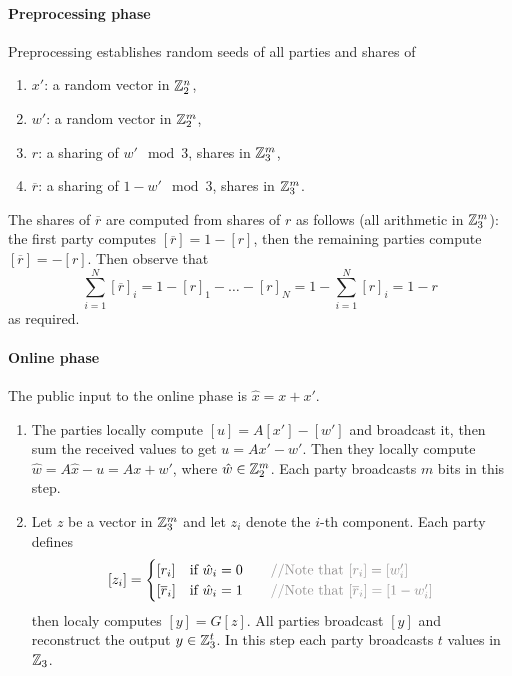 \paragraph{Preprocessing phase} Preprocessing establishes random seeds of all parties and shares of 
\begin{enumerate}
\item $x'$: a random vector in $\mathbb{Z}_2^{n}$,
\item $w'$: a random vector in $\mathbb{Z}_2^{m}$, 
\item $r$: a sharing of $w' \mod 3$, shares in $\mathbb{Z}_3^m$,  
\item $\overline{r}$: a sharing of $1-w' \mod 3$, shares in $\mathbb{Z}_3^m$. 
\end{enumerate}
The shares of $\overline{r}$ are computed from shares of $r$ as follows (all arithmetic in $\mathbb{Z}_3^m$): the first
party computes $[\overline{r}] = 1 - [r]$, then the remaining parties compute
$[\overline{r}] = -[r]$.  Then observe that 
\[\sum_{i=1}^N [\overline{r}]_i = 1-[r]_1 - \ldots - [r]_N = 1 - \sum_{i=1}^{N}[r]_i = 1-r \]
 as required. 

\paragraph{Online phase}
The public input to the online phase is $\hat{x} = x + x'$. 
\begin{enumerate}

\item The parties locally compute $[u] = A[x'] - [w']$ and broadcast it, 
then sum the received values to get $u = Ax' - w'$.  Then they locally compute
$\hat{w} = A\hat{x} - u = Ax + w'$, where $\hat{w} \in \mathbb{Z}_2^{m}$. Each party broadcasts $m$ bits in this step. 

\item Let $z$ be a vector in $\mathbb{Z}_3^m$ and let $z_i$ denote the $i$-th component. Each party defines 
\[
    [z_i]  = \begin{cases}
                [r_i]  & \text{if $\hat{w}_i = 0$} \algcomment{\text{Note that $[r_i] = [w_i']$}}\\
                [\overline{r}_i]  & \text{if $\hat{w}_i = 1$} \algcomment{\text{Note that $[\overline{r}_i] = [1- w_i']$}}\\
            \end{cases}
\]
then localy computes $[y] = G[z]$. All parties broadcast $[y]$ and reconstruct the output $y\in\mathbb{Z}_{3}^t$. 
In this step each party broadcasts $t$ values in $\mathbb{Z}_3$.
\end{enumerate}

